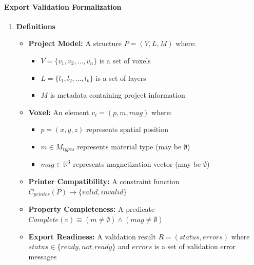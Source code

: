 \documentclass[12pt, titlepage]{article}
\begin{document}
\paragraph{Export Validation Formalization}
\begin{enumerate}
\item \textbf{Definitions}
\begin{itemize}
\item \textbf{Project Model:} A structure $P = (V, L, M)$ where:
\begin{itemize}
\item $V = \{v_1, v_2, \ldots, v_n\}$ is a set of voxels
\item $L = \{l_1, l_2, \ldots, l_k\}$ is a set of layers
\item $M$ is metadata containing project information
\end{itemize}
\item \textbf{Voxel:} An element $v_i = (p, m, mag)$ where:
\begin{itemize}
\item $p = (x, y, z)$ represents spatial position
\item $m \in M_{types}$ represents material type (may be $\emptyset$)
\item $mag \in \mathbb{R}^3$ represents magnetization vector (may be $\emptyset$)
\end{itemize}
\item \textbf{Printer Compatibility:} A constraint function $C_{printer}(P) \rightarrow \{valid, invalid\}$
\item \textbf{Property Completeness:} A predicate $Complete(v) \equiv (m \neq \emptyset) \land (mag \neq \emptyset)$
\item \textbf{Export Readiness:} A validation result $R = (status, errors)$ where $status \in \{ready, not\_ready\}$ and $errors$ is a set of validation error messages
\end{itemize}


\end{enumerate}
\end{document}
